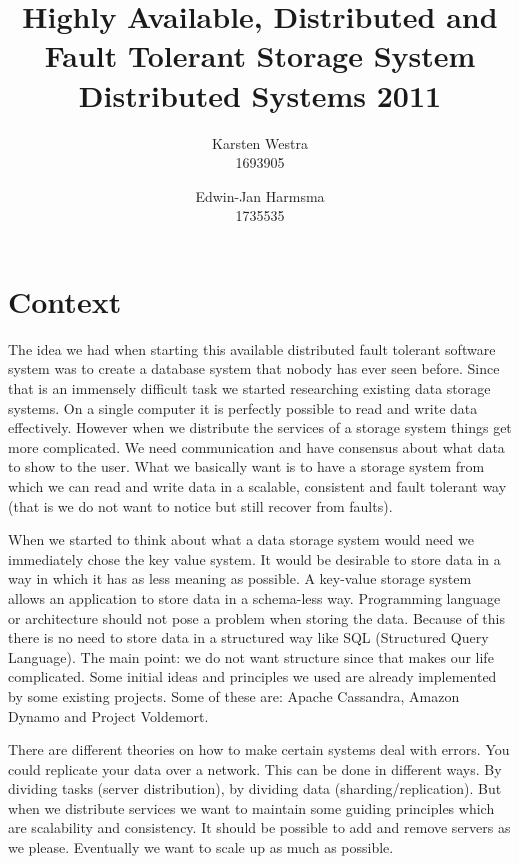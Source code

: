 \documentclass[12pt,a4paper]{scrartcl}
\title{\large{Highly Available, Distributed and Fault Tolerant Storage System} \\ \normalsize{Distributed Systems 2011}}
\author{Karsten Westra\\1693905 \and Edwin-Jan Harmsma\\1735535}
\begin{document}
\maketitle

\tableofcontents
\clearpage



\section{Context}
The idea we had when starting this available distributed fault tolerant software system was to create a database system that nobody has ever seen before. Since that is an immensely difficult task we started researching existing data storage systems. On a single computer it is perfectly possible to read and write data effectively. However when we distribute the services of a storage system things get more complicated. We need communication and have consensus about what data to show to the user. What we basically want is to have a storage system from which we can read and write data in a scalable, consistent and fault tolerant way (that is we do not want to notice but still recover from faults).

When we started to think about what a data storage system would need we immediately chose the key value system. It would be desirable to store data in a way in which it has as less meaning as possible. A key-value storage system allows an application to store data in a schema-less way. Programming language or architecture should not pose a problem when storing the data. Because of this there is no need to store data in a structured way like SQL (Structured Query Language). The main point: we do not want structure since that makes our life complicated. Some initial ideas and principles we used are already implemented by some existing projects. Some of these are: Apache Cassandra, Amazon Dynamo and Project Voldemort.

There are different theories on how to make certain systems deal with errors. You could replicate your data over a network. This can be done in different ways. By dividing tasks (server distribution), by dividing data (sharding/replication). But when we distribute services we want to maintain some guiding principles which are scalability and consistency. It should be possible to add and remove servers as we please. Eventually we want to scale up as much as possible.
\end{document}
